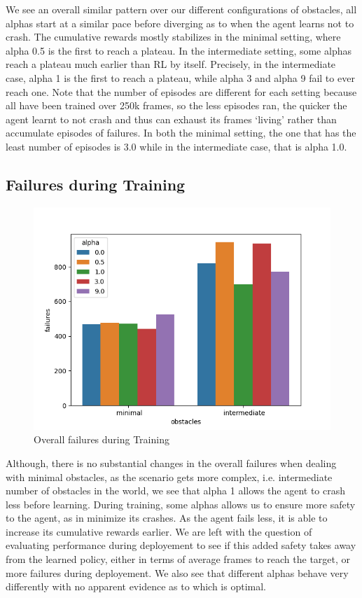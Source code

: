     \smallskip
  We see an overall similar pattern over our different configurations of obstacles, 
  all alphas start at a similar pace before diverging as to when the agent learns not to crash. 
  The cumulative rewards mostly stabilizes in the minimal setting, where alpha 0.5 is the first to reach a plateau. 
  In the intermediate setting, some alphas reach a plateau much earlier than RL by itself. 
  Precisely, in the intermediate case, alpha 1 is the first to reach a plateau, while alpha 3 and alpha 9 fail to ever reach one. 
  Note that the number of episodes are different for each setting because all have been trained over 250k frames, so the less episodes ran, 
  the quicker the agent learnt to not crash and thus can exhaust its
  frames `living' rather than accumulate episodes of failures. 
  In both the minimal setting, the one that has the least number of episodes is 3.0 while in the intermediate case, that is alpha 1.0.

\subsection{Failures during Training}

  \begin{figure}[H]
    \centering
    \includegraphics[scale=0.8]{figures/sfe.png}
    \caption{Overall failures during Training}
    \label{fig:sfe}
  \end{figure}

  Although, there is no substantial changes in the overall failures when dealing with minimal obstacles, as the scenario gets more complex, i.e. intermediate number of obstacles in the world, 
  we see that alpha 1 allows the agent to crash less before learning. 
  During training, some alphas allows us to ensure more safety to the agent, as in minimize its crashes. As the agent fails less, it is able to increase its cumulative rewards earlier. 
  We are left with the question of evaluating performance during deployement to see if this added safety takes away from the learned policy, either in terms of average frames to reach the target, or 
  more failures during deployement. We also see that different alphas behave very differently with no apparent evidence as to which is optimal. 

